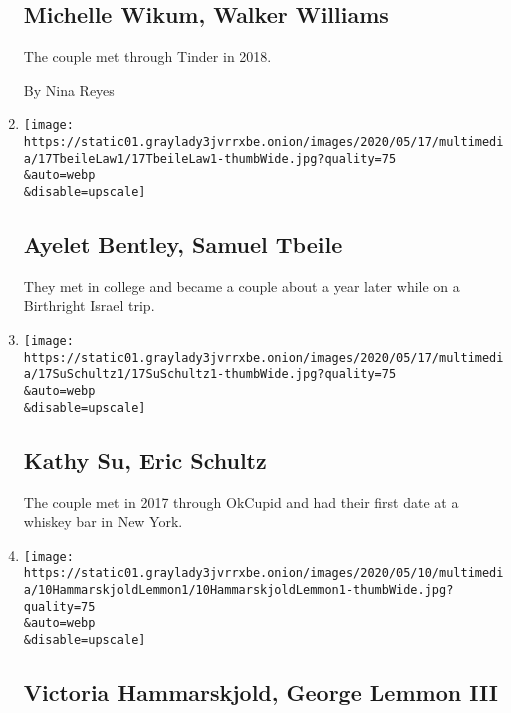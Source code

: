 \begin{enumerate}
  \hypertarget{michelle-wikum-walker-williams}{%
  \subsection{Michelle Wikum, Walker
  Williams}\label{michelle-wikum-walker-williams}}

  The couple met through Tinder in 2018.

  By Nina Reyes
\item
  \href{/2020/05/17/fashion/weddings/ayelet-bentley-samuel-tbeile.html}{}

  \texttt{[image: https://static01.graylady3jvrrxbe.onion/images/2020/05/17/multimedia/17TbeileLaw1/17TbeileLaw1-thumbWide.jpg?quality=75\\\&auto=webp\\\&disable=upscale]}

  \hypertarget{ayelet-bentley-samuel-tbeile}{%
  \subsection{Ayelet Bentley, Samuel
  Tbeile}\label{ayelet-bentley-samuel-tbeile}}

  They met in college and became a couple about a year later while on a
  Birthright Israel trip.
\item
  \href{/2020/05/17/fashion/weddings/kathy-su-eric-schultz.html}{}

  \texttt{[image: https://static01.graylady3jvrrxbe.onion/images/2020/05/17/multimedia/17SuSchultz1/17SuSchultz1-thumbWide.jpg?quality=75\\\&auto=webp\\\&disable=upscale]}

  \hypertarget{kathy-su-eric-schultz}{%
  \subsection{Kathy Su, Eric Schultz}\label{kathy-su-eric-schultz}}

  The couple met in 2017 through OkCupid and had their first date at a
  whiskey bar in New York.
\item
  \href{/2020/05/10/fashion/weddings/victoria-hammarskjold-george-lemmon-iii.html}{}

  \texttt{[image: https://static01.graylady3jvrrxbe.onion/images/2020/05/10/multimedia/10HammarskjoldLemmon1/10HammarskjoldLemmon1-thumbWide.jpg?quality=75\\\&auto=webp\\\&disable=upscale]}

  \hypertarget{victoria-hammarskjold-george-lemmon-iii}{%
  \subsection{Victoria Hammarskjold, George Lemmon
  III}\label{victoria-hammarskjold-george-lemmon-iii}}


\end{enumerate}
